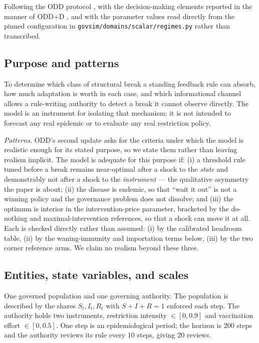 \noindent Following the ODD protocol \citep{grimm2006odd,grimm2010oddupdate,grimm2020odd},
with the decision-making elements reported in the manner of ODD+D \citep{muller2013oddd}, and with
the parameter values read directly from the pinned configuration in
\texttt{govsim/domains/scalar/regimes.py} rather than transcribed.

\subsection*{Purpose and patterns}
To determine which class of structural break a standing feedback rule can absorb, how much
adaptation is worth in each case, and which informational channel allows a rule-writing authority to
detect a break it cannot observe directly. The model is an instrument for isolating that mechanism;
it is not intended to forecast any real epidemic or to evaluate any real restriction policy.

\emph{Patterns.} ODD's second update asks for the criteria under which the model is realistic
enough for its stated purpose, so we state them rather than leaving realism implicit. The model is
adequate for this purpose if: (i) a threshold rule tuned before a break remains near-optimal after a
shock to the \emph{state} and demonstrably not after a shock to the \emph{instrument} --- the
qualitative asymmetry the paper is about; (ii) the disease is endemic, so that ``wait it out'' is not
a winning policy and the governance problem does not dissolve; and (iii) the optimum is interior in
the intervention-price parameter, bracketed by the do-nothing and maximal-intervention references, so
that a shock can move it at all. Each is checked directly rather than assumed: (i) by the calibrated
headroom table, (ii) by the waning-immunity and importation terms below, (iii) by the two corner
reference arms. We claim no realism beyond these three.

\subsection*{Entities, state variables, and scales}
One governed population and one governing authority. The population is described by the shares
$S_t, I_t, R_t$ with $S+I+R=1$ enforced each step. The authority holds two instruments, restriction
intensity $\in [0, 0.9]$ and vaccination effort $\in [0, 0.5]$. One step is an epidemiological
period; the horizon is 200 steps and the authority reviews its rule every
10 steps, giving 20 reviews.

